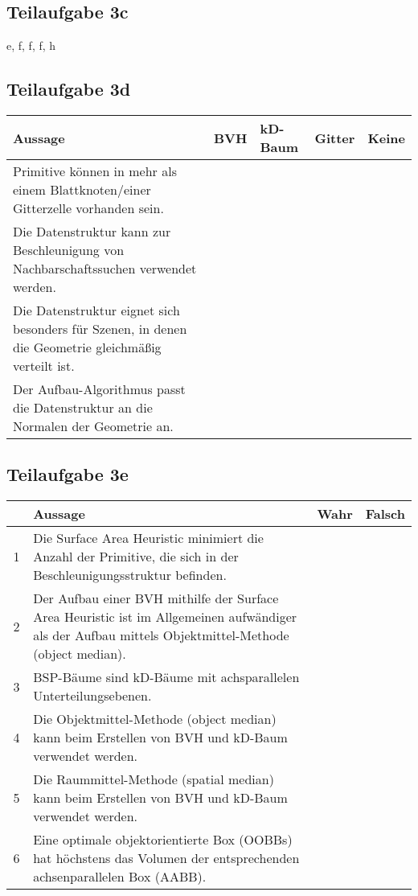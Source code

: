 \documentclass[a4paper]{scrartcl}
\begin{document}
\subsection*{Teilaufgabe 3c}
e, f, f, f, h

\subsection*{Teilaufgabe 3d}
\begin{tabular}{p{7cm}p{1.5cm}p{1.5cm}p{1.5cm}p{1.5cm}}\toprule
	\textbf{Aussage}                                                                                     & \textbf{BVH} & \textbf{kD-Baum} & \textbf{Gitter} & \textbf{Keine} \\\midrule
	Primitive können in mehr als einem Blattknoten/einer Gitterzelle vorhanden sein.                     & \CheckedBox  & \CheckedBox      & \CheckedBox     & \Square        \\
	Die Datenstruktur kann zur Beschleunigung von Nachbarschaftssuchen verwendet werden.                 & \Square      & \Square          & \CheckedBox     & \Square        \\
	Die Datenstruktur eignet sich besonders für Szenen, in denen die Geometrie gleichmäßig verteilt ist. & \Square      & \Square          & \CheckedBox     & \Square        \\
	Der Aufbau-Algorithmus passt die Datenstruktur an die Normalen der Geometrie an.                     & \Square      & \Square          & \Square         & \CheckedBox    \\\bottomrule
\end{tabular}

\subsection*{Teilaufgabe 3e}
\begin{tabular}{cp{12cm}ll}\toprule
	~ & \textbf{Aussage} & \textbf{Wahr} & \textbf{Falsch} \\\midrule
	1 & Die Surface Area Heuristic minimiert die Anzahl der Primitive, die sich in der Beschleunigungsstruktur befinden.
	  & \Square     & \CheckedBox \\
	2 & Der Aufbau einer BVH mithilfe der Surface Area Heuristic ist im Allgemeinen aufwändiger als der Aufbau mittels Objektmittel-Methode (object median).
	  & \CheckedBox & \Square     \\
	3 & BSP-Bäume sind kD-Bäume mit achsparallelen Unterteilungsebenen.
	  & \Square     & \CheckedBox \\
	4 & Die Objektmittel-Methode (object median) kann beim Erstellen von BVH und kD-Baum verwendet werden.
	  & \CheckedBox & \Square     \\
	5 & Die Raummittel-Methode (spatial median) kann beim Erstellen von BVH und kD-Baum verwendet werden.
	  & \CheckedBox & \Square     \\
	6 & Eine optimale objektorientierte Box (OOBBs) hat höchstens das Volumen der entsprechenden achsenparallelen Box (AABB).
	  & \CheckedBox & \Square     \\\bottomrule
\end{tabular}
\end{document}
